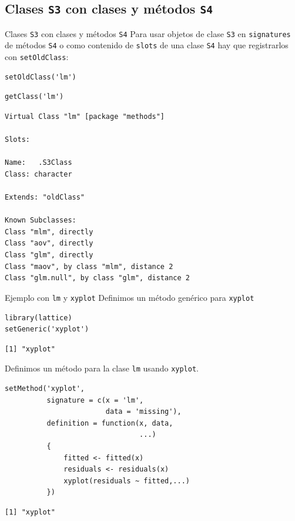 \documentclass[xcolor={usenames,svgnames,dvipsnames}]{beamer}
\begin{document}
\subsection{Clases \texttt{S3} con clases y métodos \texttt{S4}}
\label{sec:org270735c}

\begin{frame}[fragile,label={sec:orgfd02c96}]{Clases \texttt{S3} con clases y métodos \texttt{S4}}
 Para usar objetos de clase \texttt{S3} en \texttt{signatures} de métodos \texttt{S4} o
como contenido de \texttt{slots} de una clase \texttt{S4} hay que registrarlos con
\texttt{setOldClass}:
\lstset{language=r,label= ,caption= ,captionpos=b,numbers=none}
\begin{lstlisting}
setOldClass('lm')
\end{lstlisting}

\lstset{language=r,label= ,caption= ,captionpos=b,numbers=none}
\begin{lstlisting}
getClass('lm')
\end{lstlisting}

\begin{verbatim}
Virtual Class "lm" [package "methods"]

Slots:
                
Name:   .S3Class
Class: character

Extends: "oldClass"

Known Subclasses: 
Class "mlm", directly
Class "aov", directly
Class "glm", directly
Class "maov", by class "mlm", distance 2
Class "glm.null", by class "glm", distance 2
\end{verbatim}
\end{frame}

\begin{frame}[fragile,label={sec:org56411ff}]{Ejemplo con \texttt{lm} y \texttt{xyplot}}
 Definimos un método genérico para \texttt{xyplot}
\lstset{language=r,label= ,caption= ,captionpos=b,numbers=none}
\begin{lstlisting}
library(lattice)
setGeneric('xyplot')
\end{lstlisting}

\begin{verbatim}
[1] "xyplot"
\end{verbatim}

Definimos un método para la clase \texttt{lm} usando \texttt{xyplot}.
\lstset{language=r,label= ,caption= ,captionpos=b,numbers=none}
\begin{lstlisting}
setMethod('xyplot',
          signature = c(x = 'lm',
                        data = 'missing'),
          definition = function(x, data,
                                ...)
          {
              fitted <- fitted(x)
              residuals <- residuals(x)
              xyplot(residuals ~ fitted,...)
          })

\end{lstlisting}

\begin{verbatim}
[1] "xyplot"
\end{verbatim}
\end{frame}
\end{document}
